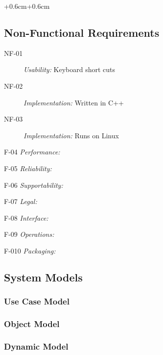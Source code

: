 \documentclass[english]{article}
\begin{document}
\begin{adjustwidth*}{+0.6cm}{+0.6cm}
\subsection{Non-Functional Requirements}
\begin{description}
\item[NF-01] {\large{}\textit{Usability:} Keyboard short cuts}{\large \par}
\item[NF-02] {\large{}\textit{Implementation:} Written in C++}{\large \par}
\item[NF-03] {\large{}\textit{Implementation:} Runs on Linux}{\large \par}
\end{description}
\item[F-04] {\large{}\textit{Performance:} }{\large \par}
\item[F-05] {\large{}\textit{Reliability:}}{\large \par}
\item[F-06] {\large{}\textit{Supportability:}}{\large \par}
\item[F-07] {\large{}\textit{Legal:}}{\large \par}
\item[F-08] {\large{}\textit{Interface:}}{\large \par}
\item[F-09] {\large{}\textit{Operations:}}{\large \par}
\item[F-010] {\large{}\textit{Packaging:}}{\large \par}

\subsection{System Models}


\subsubsection{Use Case Model}


\subsubsection{Object Model}


\subsubsection{Dynamic Model}



\end{adjustwidth*}
\end{document}
